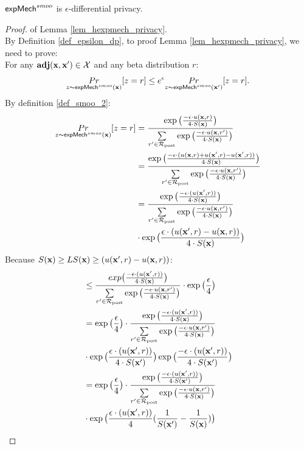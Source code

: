 \documentclass{article}
\begin{document}
\begin{lem}
\label{lem_hexpmech_privacy}
$\mathsf{expMech}^{smoo}$ is $\epsilon$-differential privacy.
\end{lem}
\begin{proof} of Lemma \ref{lem_hexpmech_privacy}.\\
  By Definition \ref{def_epsilon_dp}, to proof Lemma \ref{lem_hexpmech_privacy}, we need to prove:\\
  For any $\textbf{adj}(\textbf{x},\textbf{x}') \in \mathcal{X}$ and any beta distribution $r$:
  \begin{equation*}
  \underset{z \thicksim \mathsf{expMech}^{smoo}(\textbf{x})}{Pr}[z = r] \leq e^{\epsilon} \underset{z \thicksim \mathsf{expMech}^{smoo}(\textbf{x}')}{Pr}[z = r]. 
  \end{equation*}
  By definition \ref{def_smoo_2}:
  \begin{equation*}
  \begin{split}
  \underset{z \thicksim \mathsf{expMech}^{smoo}(\textbf{x})}{Pr}[z = r] 
  & = \frac {\exp\big(\frac{-\epsilon\cdot u(\textbf{x}, {r})}{4\cdot S(\textbf{x})}\big)}{\sum\limits_{r'\in \mathcal{R}_{\textup{post}}} \exp \big(\frac{-\epsilon\cdot u(\textbf{x}, r')}{4 \cdot S(\textbf{x})}\big)} \\
  & = \frac {\exp\big(
  \frac{-\epsilon\cdot(u(\textbf{x}, {r}) + u(\textbf{x}', {r}) - u(\textbf{x}', {r}))}{4\cdot S(\textbf{x})}
  \big)}
  {\sum\limits_{r'\in \mathcal{R}_{\textup{post}}} \exp \big(\frac{-\epsilon\cdot u(\textbf{x}, r')}{4 \cdot S(\textbf{x})}\big)} \\
  & = \frac {\exp\big(
  \frac{-\epsilon\cdot(u(\textbf{x}', {r}))}{4\cdot S(\textbf{x})}
  \big)}
  {\sum\limits_{r'\in \mathcal{R}_{\textup{post}}} \exp \big(\frac{-\epsilon\cdot u(\textbf{x}, r')}{4 \cdot S(\textbf{x})}\big)}
  \\
  & \cdot \exp\big( \frac{\epsilon\cdot(u(\textbf{x}', {r}) - u(\textbf{x}, {r}))}{4\cdot S(\textbf{x})} \big)\\
  \end{split}
  \end{equation*}
  Because $S(\textbf{x}) \geq LS(\textbf{x}) \geq (u(\textbf{x}', {r}) - u(\textbf{x}, {r}))$:
  \begin{equation*}
  \begin{split}
  & \leq \frac {exp\big(
  \frac{-\epsilon\cdot(u(\textbf{x}', {r}))}{4\cdot S(\textbf{x})}
  \big)}
  {\sum\limits_{r'\in \mathcal{R}_{\textup{post}}} \exp \big(\frac{-\epsilon\cdot u(\textbf{x}, r')}{4 \cdot S(\textbf{x})}\big)}
  \cdot \exp\big( \frac{\epsilon}{4} \big) \\
  & = \exp\big( \frac{\epsilon}{4} \big) \cdot 
  \frac {
  \exp
  \big(
  \frac{-\epsilon\cdot(u(\textbf{x}', {r}))}{4\cdot S(\textbf{x})}
  \big)
  } 
  {\sum\limits_{r'\in \mathcal{R}_{\textup{post}}} \exp \big(\frac{-\epsilon\cdot u(\textbf{x}, r')}{4 \cdot S(\textbf{x})}\big)}\\
  & \cdot \exp
  \big(
  \frac{\epsilon\cdot(u(\textbf{x}', {r}))}{4\cdot S(\textbf{x}')}
  \big)
  \exp
  \big(
  \frac{-\epsilon\cdot(u(\textbf{x}', {r}))}{4\cdot S(\textbf{x}')}
  \big)\\
  & = \exp\big( \frac{\epsilon}{4} \big) \cdot 
  \frac {
  \exp
  \big(
  \frac{-\epsilon\cdot(u(\textbf{x}', {r}))}{4\cdot S(\textbf{x}')}
  \big)
  } 
  {\sum\limits_{r'\in \mathcal{R}_{\textup{post}}} \exp \big(\frac{-\epsilon\cdot u(\textbf{x}, r')}{4 \cdot S(\textbf{x})}\big)}\\
  & \cdot \exp
  \big(
  \frac{\epsilon\cdot(u(\textbf{x}', {r}))}{4}(\frac{1}{S(\textbf{x}')} - \frac{1}{S(\textbf{x})})
  \big)\\
  \end{split}
  \end{equation*}
  

\end{proof}
\end{document}
